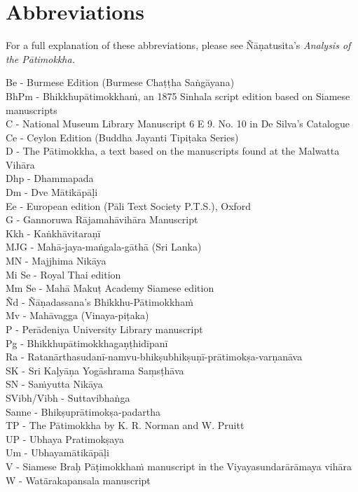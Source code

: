 
\chapter{Abbreviations}
\label{abbreviations}

{\raggedright

For a full explanation of these abbreviations, please see Ñāṇatusita's \textit{Analysis of the Pātimokkha.}

\smallskip

Be - Burmese Edition (Burmese Chaṭṭha Saṅgāyana)\\
BhPm - Bhikkhupātimokkhaṁ, an 1875 Sinhala script edition based on Siamese manuscripts\\
C - National Museum Library Manuscript 6 E 9. No. 10 in De Silva’s Catalogue\\
Ce - Ceylon Edition (Buddha Jayanti Tipiṭaka Series)\\
D - The Pātimokkha, a text based on the manuscripts found at the Malwatta Vihāra\\
Dhp - Dhammapada\\
Dm - Dve Mātikāpāḷi\\
Ee - European edition (Pāli Text Society P.T.S.), Oxford\\
G - Gannoruwa Rājamahāvihāra Manuscript\\
Kkh - Kaṅkhāvitaraṇī\\
MJG - Mahā-jaya-maṅgala-gāthā (Sri Lanka)\\
MN - Majjhima Nikāya\\
Mi Se - Royal Thai edition\\
Mm Se - Mahā Makuṭ Academy Siamese edition\\
Ñd - Ñāṇadassana's Bhikkhu-Pātimokkhaṁ\\
Mv - Mahāvagga (Vinaya-piṭaka)\\
P - Perādeniya University Library manuscript\\
Pg - Bhikkhupātimokkhagaṇṭhidīpanī\\
Ra - Ratanārthasudanī-namvu-bhikṣubhikṣuṇī-prātimokṣa-varṇanāva\\
SK - Sri Kaḷyāṇa Yogāshrama Saṃsṭhāva\\
SN - Saṁyutta Nikāya\\
SVibh/Vibh - Suttavibhaṅga\\
Sanne - Bhikṣuprātimokṣa-padartha\\
TP - The Pātimokkha by K. R. Norman and W. Pruitt\\
UP - Ubhaya Pratimokṣaya\\
Um - Ubhayamātikāpāḷi\\
V - Siamese Braḥ Pāṭimokkhaṁ manuscript in the Viyayasundarārāmaya vihāra\\
W - Watärakapansala manuscript\\

}

